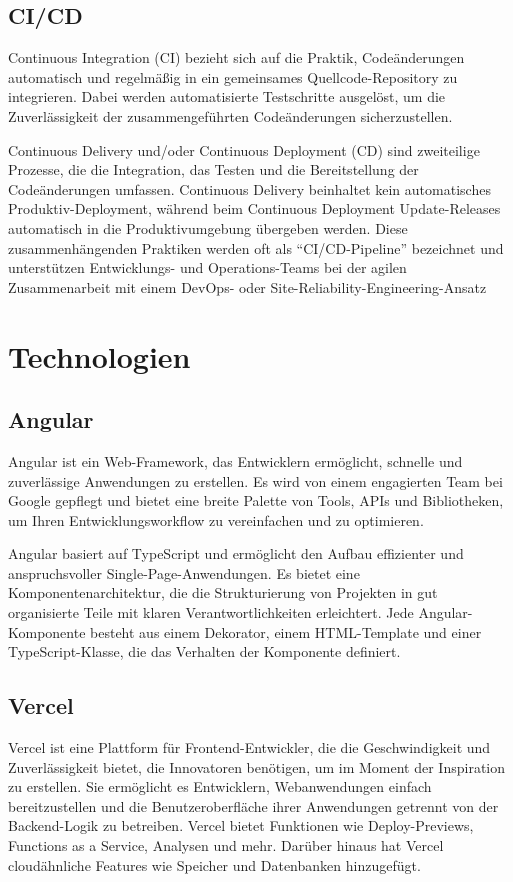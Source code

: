 \subsection{CI/CD}
Continuous Integration (CI) bezieht sich auf die Praktik, Codeänderungen automatisch und regelmäßig in ein gemeinsames 
Quellcode-Repository zu integrieren. Dabei werden automatisierte Testschritte ausgelöst, um die Zuverlässigkeit der zusammengeführten 
Codeänderungen sicherzustellen.

Continuous Delivery und/oder Continuous Deployment (CD) sind zweiteilige Prozesse, die die Integration, das Testen und die Bereitstellung
der Codeänderungen umfassen. Continuous Delivery beinhaltet kein automatisches Produktiv-Deployment, während beim Continuous Deployment 
Update-Releases automatisch in die Produktivumgebung übergeben werden. Diese zusammenhängenden Praktiken werden oft als “CI/CD-Pipeline”
bezeichnet und unterstützen Entwicklungs- und Operations-Teams bei der agilen Zusammenarbeit mit einem DevOps- oder Site-Reliability-Engineering-Ansatz

\section{Technologien}




\subsection{ Angular }
Angular ist ein Web-Framework, das Entwicklern ermöglicht, schnelle und zuverlässige Anwendungen zu erstellen. Es wird von 
einem engagierten Team bei Google gepflegt und bietet eine breite Palette von Tools, APIs und Bibliotheken, um Ihren 
Entwicklungsworkflow zu vereinfachen und zu optimieren.

Angular basiert auf TypeScript und ermöglicht den Aufbau effizienter und anspruchsvoller Single-Page-Anwendungen. Es bietet 
eine Komponentenarchitektur, die die Strukturierung von Projekten in gut organisierte Teile mit klaren Verantwortlichkeiten 
erleichtert. Jede Angular-Komponente besteht aus einem Dekorator, einem HTML-Template und einer TypeScript-Klasse, die das 
Verhalten der Komponente definiert.
 
\subsection{ Vercel }
Vercel ist eine Plattform für Frontend-Entwickler, die die Geschwindigkeit und Zuverlässigkeit bietet, die Innovatoren 
benötigen, um im Moment der Inspiration zu erstellen. Sie ermöglicht es Entwicklern, Webanwendungen einfach bereitzustellen 
und die Benutzeroberfläche ihrer Anwendungen getrennt von der Backend-Logik zu betreiben. Vercel bietet Funktionen wie 
Deploy-Previews, Functions as a Service, Analysen und mehr. Darüber hinaus hat Vercel cloudähnliche Features wie Speicher 
und Datenbanken hinzugefügt.

